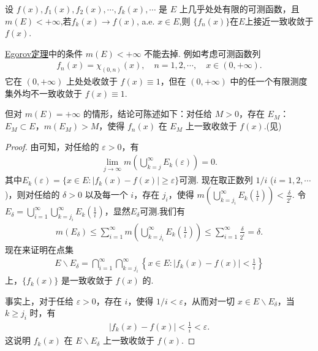 \documentclass[../../main.tex]{subfiles}
\begin{document}
\begin{theorem}\label{theorem:Egorov定理}
设 $f(x),f_1(x),f_2(x),\cdots,f_k(x),\cdots$ 是 $E$ 上几乎处处有限的可测函数，且 $m(E)<+\infty$,若$f_k(x)\to f(x)$, a.e. $x\in E$,则
$\{f_n(x)\}$在$E$上接近一致收敛于$f(x)$.
\end{theorem}
\begin{remark}
\hyperref[theorem:Egorov定理]{Egorov定理}中的条件 $m(E)<+\infty$ 不能去掉. 例如考虑可测函数列
\begin{align*}
f_n(x)=\chi_{(0,n)}(x),\quad n = 1,2,\cdots,\quad x\in(0,+\infty).
\end{align*}
它在 $(0,+\infty)$ 上处处收敛于 $f(x)\equiv1$，但在 $(0,+\infty)$ 中的任一个有限测度集外均不一致收敛于 $f(x)\equiv1$.

但对 $m(E)=+\infty$ 的情形，结论可陈述如下：对任给 $M>0$，存在 $E_M$：$E_M\subset E$，$m(E_M)>M$，使得 $f_n(x)$ 在 $E_M$ 上一致收敛于 $f(x)$.(见)
\end{remark}
\begin{proof}
由可知，对任给的 $\varepsilon>0$，有
\begin{align*}
\lim_{j\to\infty}m\left(\bigcup_{k = j}^{\infty}E_k(\varepsilon)\right)=0.
\end{align*}
其中$E_k(\varepsilon) = \{x \in E: |f_k(x) - f(x)| \geqslant \varepsilon\}$可测.
现在取正数列 $1/i$ ($i = 1,2,\cdots$)，则对任给的 $\delta>0$ 以及每一个 $i$，存在 $j_i$，使得 $m\left(\bigcup_{k = j_i}^{\infty}E_k\left(\frac{1}{i}\right)\right)<\frac{\delta}{2^i}$. 令 $E_\delta=\bigcup_{i = 1}^{\infty}\bigcup_{k = j_i}^{\infty}E_k\left(\frac{1}{i}\right)$，显然$E_\delta$可测.我们有
\begin{align*}
m(E_\delta)\leqslant\sum_{i = 1}^{\infty}m\left(\bigcup_{k = j_i}^{\infty}E_k\left(\frac{1}{i}\right)\right)\leqslant\sum_{i = 1}^{\infty}\frac{\delta}{2^i}=\delta.
\end{align*}
现在来证明在点集
\begin{align*}
E\backslash E_\delta=\bigcap_{i = 1}^{\infty}\bigcap_{k = j_i}^{\infty}\left\{x\in E:\vert f_k(x)-f(x)\vert<\frac{1}{i}\right\}
\end{align*}
上，$\{f_k(x)\}$ 是一致收敛于 $f(x)$ 的.

事实上，对于任给 $\varepsilon>0$，存在 $i$，使得 $1/i<\varepsilon$，从而对一切 $x\in E\backslash E_\delta$，当 $k\geqslant j_i$ 时，有
\begin{align*}
\vert f_k(x)-f(x)\vert<\frac{1}{i}<\varepsilon.
\end{align*}
这说明 $f_k(x)$ 在 $E\backslash E_\delta$ 上一致收敛于 $f(x)$. 

\end{proof}
\end{document}
